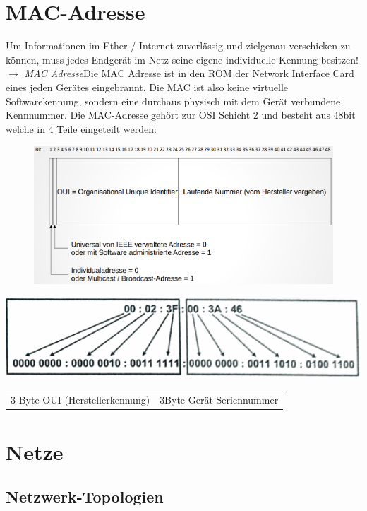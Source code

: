 \documentclass[12pt,a4paper]{article}
\begin{document}
	\section{MAC-Adresse}
	Um Informationen im Ether / Internet zuverlässig und zielgenau verschicken zu können, muss jedes Endgerät im Netz seine eigene individuelle Kennung besitzen!\newline $\longrightarrow$ \emph{MAC Adresse}\newline Die MAC Adresse ist in den ROM der Network Interface Card eines jeden Gerätes eingebrannt. Die MAC ist also keine virtuelle Softwarekennung, sondern eine durchaus physisch mit dem Gerät verbundene Kennnummer. Die MAC-Adresse gehört zur OSI Schicht 2 und besteht aus 48bit welche in 4 Teile eingeteilt werden:
	\begin{center}
		\begin{figure}
			\includegraphics[width=\textwidth]{Bilder/MAC-Adresse.PNG}
		\end{figure}
	\end{center}
	\begin{center}
		\includegraphics[scale=1]{Bilder/MAC.png}
		\begin{tabularx}{14cm}{XX}
			3 Byte OUI (Herstellerkennung)&3Byte Gerät-Seriennummer
		\end{tabularx}
	\end{center}

	\section{Netze}
		\subsection{Netzwerk-Topologien}
\end{document}
